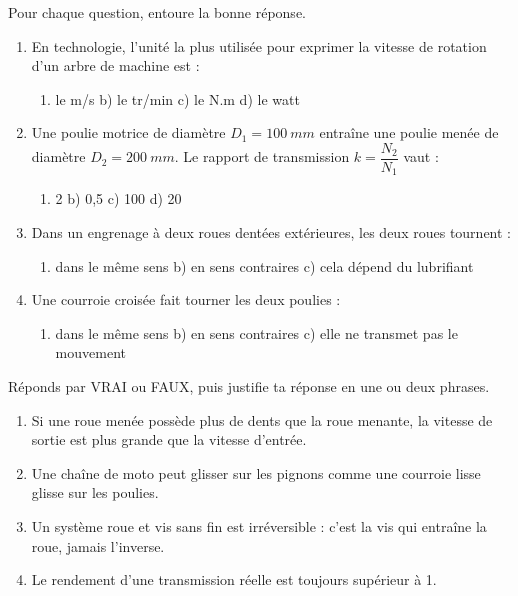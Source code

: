\documentclass[11pt]{article}
\begin{document}
\begin{exercice}
Pour chaque question, entoure la bonne réponse.
\begin{enumerate}
\item En technologie, l'unité la plus utilisée pour exprimer la vitesse de rotation d'un arbre de machine est :
\begin{enumerate}
\item le m/s \quad b) le tr/min \quad c) le N.m \quad d) le watt
\end{enumerate}
\item Une poulie motrice de diamètre $D_1 = \SI{100}{mm}$ entraîne une poulie menée de diamètre $D_2 = \SI{200}{mm}$. Le rapport de transmission $k = \dfrac{N_2}{N_1}$ vaut :
\begin{enumerate}
\item 2 \quad b) 0,5 \quad c) 100 \quad d) 20
\end{enumerate}
\item Dans un engrenage à deux roues dentées extérieures, les deux roues tournent :
\begin{enumerate}
\item dans le même sens \quad b) en sens contraires \quad c) cela dépend du lubrifiant
\end{enumerate}
\item Une courroie croisée fait tourner les deux poulies :
\begin{enumerate}
\item dans le même sens \quad b) en sens contraires \quad c) elle ne transmet pas le mouvement
\end{enumerate}
\end{enumerate}
\end{exercice}

\begin{exercice}
Réponds par VRAI ou FAUX, puis justifie ta réponse en une ou deux phrases.
\begin{enumerate}
\item Si une roue menée possède plus de dents que la roue menante, la vitesse de sortie est plus grande que la vitesse d'entrée.
\item Une chaîne de moto peut glisser sur les pignons comme une courroie lisse glisse sur les poulies.
\item Un système roue et vis sans fin est irréversible : c'est la vis qui entraîne la roue, jamais l'inverse.
\item Le rendement d'une transmission réelle est toujours supérieur à 1.
\end{enumerate}
\end{exercice}
\end{document}
